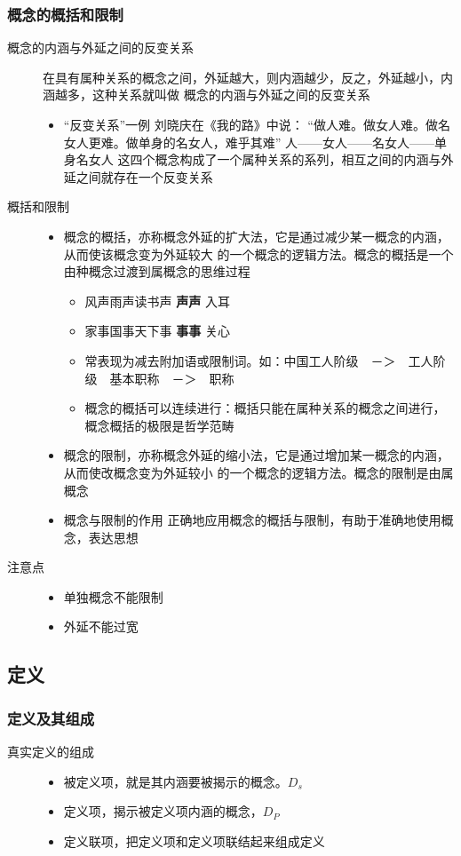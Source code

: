 \documentclass[11pt]{article}
\begin{document}
\subsubsection{概念的概括和限制}
\label{sec-3-1-5}
\begin{description}
\item[{概念的内涵与外延之间的反变关系}] 在具有属种关系的概念之间，外延越大，则内涵越少，反之，外延越小，内涵越多，这种关系就叫做
概念的内涵与外延之间的反变关系
\begin{itemize}
\item “反变关系”一例
刘晓庆在《我的路》中说：
“做人难。做女人难。做名女人更难。做单身的名女人，难乎其难”
人——女人——名女人——单身名女人
这四个概念构成了一个属种关系的系列，相互之间的内涵与外延之间就存在一个反变关系
\end{itemize}
\item[{概括和限制}] \begin{itemize}
\item 概念的概括，亦称概念外延的扩大法，它是通过减少某一概念的内涵，从而使该概念变为外延较大
的一个概念的逻辑方法。概念的概括是一个由种概念过渡到属概念的思维过程
\begin{itemize}
\item 风声雨声读书声 \textbf{声声} 入耳
\item 家事国事天下事 \textbf{事事} 关心
\item 常表现为减去附加语或限制词。如：中国工人阶级　－＞　工人阶级　基本职称　－＞　职称
\item 概念的概括可以连续进行：概括只能在属种关系的概念之间进行，概念概括的极限是哲学范畴
\end{itemize}
\item 概念的限制，亦称概念外延的缩小法，它是通过增加某一概念的内涵，从而使改概念变为外延较小
的一个概念的逻辑方法。概念的限制是由属概念
\item 概念与限制的作用
正确地应用概念的概括与限制，有助于准确地使用概念，表达思想
\end{itemize}
\item[{注意点}] \begin{itemize}
\item 单独概念不能限制
\item 外延不能过宽
\end{itemize}
\end{description}
\subsection{定义}
\label{sec-3-2}
\subsubsection{定义及其组成}
\label{sec-3-2-1}
\begin{description}
\item[{真实定义的组成}] \begin{itemize}
\item 被定义项，就是其内涵要被揭示的概念。$D_s$
\item 定义项，揭示被定义项内涵的概念，$D_P$
\item 定义联项，把定义项和定义项联结起来组成定义
\end{itemize}
\end{description}
\end{document}
